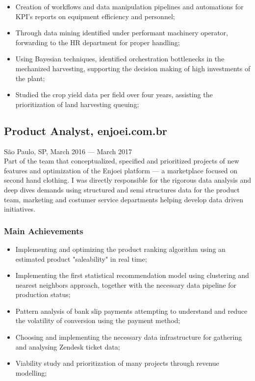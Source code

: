\documentclass{article}
\newcommand{\jobdate}[3]{
\large
\vspace{0.05em} 
  {#1, #2 --- #3}
\vspace{0.5em} 
\\
}
\begin{document}
\begin{itemize}

\item{Creation of workflows and data manipulation pipelines and automations for KPI's reports on equipment efficiency and personnel;}
\item{Through data mining identified under performant machinery operator, forwarding to the HR department for proper handling;}
\item{Using Bayesian techniques, identified orchestration bottlenecks in the mechanized harvesting, supporting the decision making of high investments of the plant;}
\item{Studied the crop yield data per field over four years, assisting the prioritization of land harvesting queuing;}

\end{itemize}

\subsection{Product Analyst, enjoei.com.br}
\jobdate{São Paulo, SP}{March 2016}{March 2017}
Part of the team that conceptualized, specified and prioritized projects of new features and optimization of the Enjoei platform --- a marketplace focused on second hand clothing. I was directly responsible for the rigorous data analysis and deep dives demands using structured and semi structures data for the product team, marketing and costumer service departments helping develop data driven initiatives.
\subsubsection{Main Achievements}

\begin{itemize}

\item{Implementing and optimizing the product ranking algorithm using an estimated product "saleability" in real time;}
\item{Implementing the first statistical recommendation model using clustering and nearest neighbors approach, together with the necessary data pipeline for production status;}
\item{Pattern analysis of bank slip payments attempting to understand and reduce the volatility of conversion using the payment method;}
\item{Choosing and implementing the necessary data infrastructure for gathering and analysing Zendesk ticket data;}
\item{Viability study and prioritization of many projects through revenue modelling;}

\end{itemize}
\pagebreak
\end{document}
